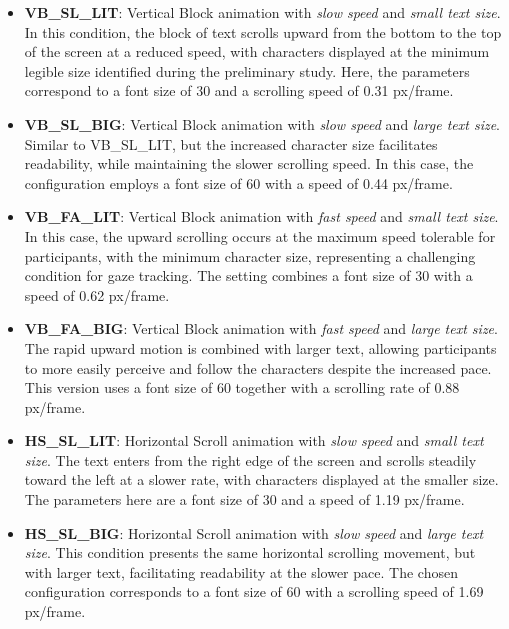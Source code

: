 \documentclass{article}
\begin{document}
\begin{itemize}
    \item \textbf{VB\_SL\_LIT}: Vertical Block animation with \emph{slow speed} and \emph{small text size}. 
    In this condition, the block of text scrolls upward from the bottom to the top of the screen at a reduced speed, with characters displayed at the minimum legible size identified during the preliminary study.
    Here, the parameters correspond to a font size of 30 and a scrolling speed of 0.31 px/frame.

    \item \textbf{VB\_SL\_BIG}: Vertical Block animation with \emph{slow speed} and \emph{large text size}. 
    Similar to VB\_SL\_LIT, but the increased character size facilitates readability, while maintaining the slower scrolling speed. 
    In this case, the configuration employs a font size of 60 with a speed of 0.44 px/frame. 

    \item \textbf{VB\_FA\_LIT}: Vertical Block animation with \emph{fast speed} and \emph{small text size}. 
    In this case, the upward scrolling occurs at the maximum speed tolerable for participants, with the minimum character size, representing a challenging condition for gaze tracking.  
    The setting combines a font size of 30 with a speed of 0.62 px/frame.

    \item \textbf{VB\_FA\_BIG}: Vertical Block animation with \emph{fast speed} and \emph{large text size}. 
    The rapid upward motion is combined with larger text, allowing participants to more easily perceive and follow the characters despite the increased pace.  
    This version uses a font size of 60 together with a scrolling rate of 0.88 px/frame. 

    \item \textbf{HS\_SL\_LIT}: Horizontal Scroll animation with \emph{slow speed} and \emph{small text size}. 
    The text enters from the right edge of the screen and scrolls steadily toward the left at a slower rate, with characters displayed at the smaller size.  
    The parameters here are a font size of 30 and a speed of 1.19 px/frame. 

    \item \textbf{HS\_SL\_BIG}: Horizontal Scroll animation with \emph{slow speed} and \emph{large text size}. 
    This condition presents the same horizontal scrolling movement, but with larger text, facilitating readability at the slower pace. 
    The chosen configuration corresponds to a font size of 60 with a scrolling speed of 1.69 px/frame. 


\end{itemize}
\end{document}
